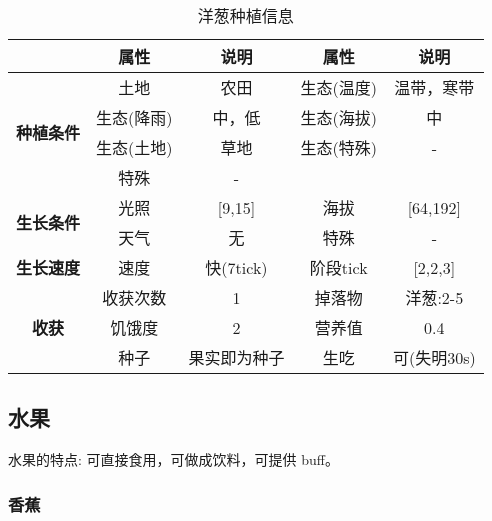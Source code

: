 \begin{table}[H]
    \centering
    \caption{洋葱种植信息}
    \label{table:洋葱种植信息}
    \setlength{\tabcolsep}{4mm}
    \begin{tabular}{c|cc|cc}
        \toprule
                                           & \textbf{属性} & \textbf{说明} & \textbf{属性} & \textbf{说明} \\
        \midrule
        \multirow{4}{*}{\textbf{种植条件}} & 土地          & 农田          & 生态(温度)    & 温带，寒带    \\
                                           & 生态(降雨)    & 中，低        & 生态(海拔)    & 中            \\
                                           & 生态(土地)    & 草地          & 生态(特殊)    & -             \\
                                           & 特殊          & -                                             \\
        \midrule
        \multirow{2}{*}{\textbf{生长条件}} & 光照          & [9,15]        & 海拔          & [64,192]      \\
                                           & 天气          & 无            & 特殊          & -             \\
        \midrule
        \textbf{生长速度}                  & 速度          & 快(7tick)     & 阶段tick      & [2,2,3]       \\
        \midrule
        \multirow{3}{*}{\textbf{收获}}     & 收获次数      & 1             & 掉落物        & 洋葱:2-5      \\
                                           & 饥饿度        & 2             & 营养值        & 0.4           \\
                                           & 种子          & 果实即为种子  & 生吃          & 可(失明30s)   \\
        \bottomrule
    \end{tabular}
\end{table}

\subsection{水果}

水果的特点: 可直接食用，可做成饮料，可提供 buff。

\subsubsection{香蕉}


